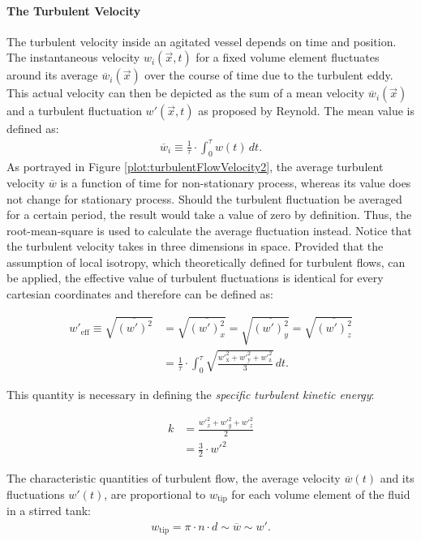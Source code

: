 \paragraph{The Turbulent Velocity}
The turbulent velocity inside an agitated vessel depends on time and position. The instantaneous velocity $w_i(\Vec{x},t)$ for a fixed volume element fluctuates around its average $\overline{w}_i(\Vec{x})$ over the course of time due to the turbulent eddy. This actual velocity can then be depicted as the sum of a mean velocity $\overline{w}_i(\Vec{x})$ and a turbulent fluctuation $w'(\Vec{x},t)$ as proposed by Reynold. The mean value is defined as:
\begin{gather}
    \overline{w}_i \equiv \frac{1}{\tau} \cdot \int_0^\tau w(t) \, dt.
\end{gather}
As portrayed in Figure \ref{plot:turbulentFlowVelocity2}, the average turbulent velocity $\overline{w}$ is a function of time for non-stationary process, whereas its value does not change for stationary process. Should the turbulent fluctuation be averaged for a certain period, the result would take a value of zero by definition. Thus, the root-mean-square is used to calculate the average fluctuation instead. Notice that the turbulent velocity takes in three dimensions in space. Provided that the assumption of local isotropy, which \citet{Kolmogorov} theoretically defined for turbulent flows, can be applied, the effective value of turbulent fluctuations is identical for every cartesian coordinates and therefore can be defined as:

\begin{align}
    {w'}_\text{eff} \equiv \sqrt{\overline{(w')^2}} &= \sqrt{\overline{(w')_x^2}} = \sqrt{\overline{(w')_y^2}} = \sqrt{\overline{(w')_z^2}} \nonumber \\
    &= \frac{1}{\tau} \cdot \int_0^\tau \sqrt{\frac{{w'}_\text{x}^2 + {w'}_\text{y}^2 + {w'}_\text{z}^2}{3}} \, dt.
\end{align}

This quantity is necessary in defining the \textit{specific turbulent kinetic energy}:

\begin{align}
        k   &= \frac{{w'}_x^2 + {w'}_y^2 + {w'}_z^2}{2} \nonumber \\
            &= \frac{3}{2} \cdot {w'}^2
\end{align}

The characteristic quantities of turbulent flow, the average velocity $\overline{w}(t)$ and its fluctuations $w'(t)$, are proportional to $w_{\text{tip}}$ for each volume element of the fluid in a stirred tank:
\begin{gather}
    w_\text{tip} = \pi{} \cdot n \cdot d \sim \overline{w} \sim w'.
\end{gather}

